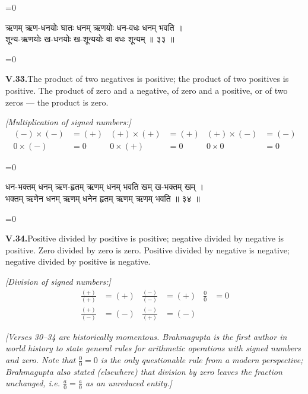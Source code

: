 \documentclass[11pt,a4paper]{article}
\newcommand{\cnote}[1]{\textcolor{notecolor}{\textit{#1}}}
\newcommand{\dev}[1]{{\devanagarifont\color{sktcolor}#1}}
\newenvironment{paracol}[1]{\begingroup}{\endgroup}
\newcommand{\switchcolumn}[1][]{%
  \ifnum#1=0\relax\else\par\nobreak\vspace{0.5em}\par\nobreak\fi%
}
\begin{document}
\vspace{0.3cm}

\begin{paracol}{2}
\switchcolumn[0]
\dev{%
ऋणम् ऋण-धनयोः घातः धनम् ऋणयोः धन-वधः धनम् भवति ।\\
शून्य-ऋणयोः ख-धनयोः ख-शून्ययोः वा वधः शून्यम् ॥ ३३ ॥
}

\switchcolumn[1]
\textbf{V.33.}\quad The product of two negatives is positive; the
product of two positives is positive. The product of zero and a
negative, of zero and a positive, or of two zeros — the product is
zero.

\medskip
\textit{[Multiplication of signed numbers:]}
\begin{align*}
(-) \times (-) &= (+) & (+) \times (+) &= (+) & (+) \times (-) &= (-)\\
0 \times (-) &= 0 & 0 \times (+) &= 0 & 0 \times 0 &= 0
\end{align*}
\end{paracol}

\vspace{0.3cm}

\begin{paracol}{2}
\switchcolumn[0]
\dev{%
धन-भक्तम् धनम् ऋण-हृतम् ऋणम् धनम् भवति खम् ख-भक्तम् खम् ।\\
भक्तम् ऋणेन धनम् ऋणम् धनेन हृतम् ऋणम् ऋणम् भवति ॥ ३४ ॥
}

\switchcolumn[1]
\textbf{V.34.}\quad Positive divided by positive is positive;
negative divided by negative is positive. Zero divided by zero
is zero. Positive divided by negative is negative; negative
divided by positive is negative.

\medskip
\textit{[Division of signed numbers:]}
\begin{align*}
\frac{(+)}{(+)} &= (+) & \frac{(-)}{(-)} &= (+) & \frac{0}{0} &= 0\\
\frac{(+)}{(-)} &= (-) & \frac{(-)}{(+)} &= (-)
\end{align*}
\end{paracol}

\vspace{0.5cm}
\cnote{[Verses 30–34 are historically momentous. Brahmagupta is the first
author in world history to state general rules for arithmetic
operations with signed numbers and zero. Note that $\frac{0}{0}=0$
is the only questionable rule from a modern perspective; Brahmagupta
also stated (elsewhere) that division by zero leaves the fraction
unchanged, i.e. $\frac{a}{0} = \frac{a}{0}$ as an unreduced entity.]}
\end{document}

